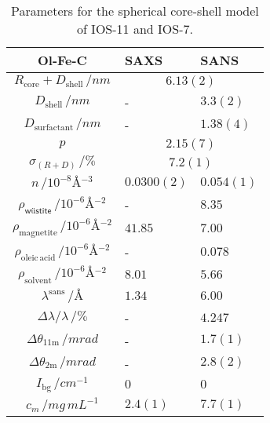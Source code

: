 \documentclass[\main/dresen_thesis.tex]{subfiles}
\begin{document}
  \begin{table}[!htbp]
    \centering
    \caption{\label{tab:colloidalCrystals:nanoparticle:sas}Parameters for the spherical core-shell model of IOS-11 and IOS-7.}
    \begin{tabular}{ c | l | l}
      \rule{0pt}{2ex} \textbf{Ol-Fe-C} & \textbf{SAXS} & \textbf{SANS}\\
      \hline
      \rule{0pt}{2ex} $R_\mathrm{core} + D_\mathrm{shell} \, / \unit{nm}$             & \multicolumn{2}{c}{$6.13(2)$} \\
      \rule{0pt}{2ex} $D_\mathrm{shell}\, / \unit{nm}$                                & -            & $3.3(2)$       \\
      \rule{0pt}{2ex} $D_\mathrm{surfactant}\, / \unit{nm}$                           & -            & $1.38(4)$    \\
      \rule{0pt}{2ex} $p $                                                            & \multicolumn{2}{c}{$2.15(7)$} \\
      \rule{0pt}{2ex} $\sigma_{(R+D)}\, / \unit{\%}$                                  & \multicolumn{2}{c}{$7.2(1)$} \\
      \rule{0pt}{2ex} $n \, / \unit{10^{-8} \angstrom^{-3}}$                          & $0.0300(2)$  &  $0.054(1)$ \\
      \hline
      \rule{0pt}{2ex} $\rho_\textsf{w\"ustite} \, / \unit{10^{-6} \angstrom^{-2}}$    & -       & $8.35$\\
      \rule{0pt}{2ex} $\rho_\mathrm{magnetite} \, / \unit{10^{-6} \angstrom^{-2}}$    & $41.85$ & $7.00$\\
      \rule{0pt}{2ex} $\rho_\mathrm{oleic\, acid} \, / \unit{10^{-6} \angstrom^{-2}}$ & -       & $0.078$\\
      \rule{0pt}{2ex} $\rho_\mathrm{solvent} \, / \unit{10^{-6} \angstrom^{-2}}$      & $8.01$  & $5.66$\\
      \hline
      \rule{0pt}{2ex} $\lambda^\mathrm{sans} \, / \unit{\unit{\angstrom}}$            & $1.34$  & $6.00$\\
      \rule{0pt}{2ex} $\Delta \lambda / \lambda \, / \unit{\%}$                       & -       & $4.247$\\
      \rule{0pt}{2ex} $\Delta \theta_\mathrm{11 m} \, / \unit{mrad}$                  & -       & $1.7(1)$\\
      \rule{0pt}{2ex} $\Delta \theta_\mathrm{2 m} \, / \unit{mrad}$                   & -       & $2.8(2)$\\
      \rule{0pt}{2ex} $I_\mathrm{bg} \, / \unit{cm^{-1}}$                             & $0$     & $0$\\
      \hline
      \rule{0pt}{2ex} $c_m \, / \unit{mg\, mL^{-1}}$                                  & $2.4(1)$ & $7.7(1)$\\
      \hline
    \end{tabular}
  \end{table}
\end{document}
